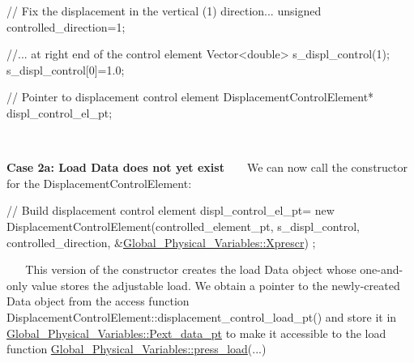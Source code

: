 \begin{DoxyItemize}
\begin{DoxyCodeInclude}
   \textcolor{comment}{// Fix the displacement in the vertical (1) direction...}
   \textcolor{keywordtype}{unsigned} controlled\_direction=1;

   \textcolor{comment}{//... at right end of the control element}
   Vector<double> s\_displ\_control(1);
   s\_displ\_control[0]=1.0;
   
   \textcolor{comment}{// Pointer to displacement control element}
   DisplacementControlElement* displ\_control\_el\_pt;

\end{DoxyCodeInclude}
 ~\newline
~\newline

\begin{DoxyItemize}
\item {\bfseries Case 2a\+: Load {\ttfamily Data} does not yet exist} ~\newline
~\newline
 We can now call the constructor for the {\ttfamily Displacement\+Control\+Element\+:} ~\newline
~\newline
 
\begin{DoxyCodeInclude}
     \textcolor{comment}{// Build displacement control element}
     displ\_control\_el\_pt=
      \textcolor{keyword}{new} DisplacementControlElement(controlled\_element\_pt,
                                     s\_displ\_control,
                                     controlled\_direction,
                                     &\hyperlink{namespaceGlobal__Physical__Variables_a1c774c9cb221df909201e81e84b15f40}{Global\_Physical\_Variables::Xprescr})
      ;

\end{DoxyCodeInclude}
 ~\newline
~\newline
 This version of the constructor creates the load {\ttfamily Data} object whose one-\/and-\/only value stores the adjustable load. We obtain a pointer to the newly-\/created {\ttfamily Data} object from the access function {\ttfamily Displacement\+Control\+Element\+::displacement\+\_\+control\+\_\+load\+\_\+pt()} and store it in {\ttfamily \hyperlink{namespaceGlobal__Physical__Variables_a9d598320fb3d7ecf94101088e8f376d2}{Global\+\_\+\+Physical\+\_\+\+Variables\+::\+Pext\+\_\+data\+\_\+pt}} to make it accessible to the load function {\ttfamily \hyperlink{namespaceGlobal__Physical__Variables_a86fd8f502cb8c4c7939ffae742f023eb}{Global\+\_\+\+Physical\+\_\+\+Variables\+::press\+\_\+load}}(...) ~\newline
~\newline
 

\end{DoxyItemize}
\end{DoxyItemize}
